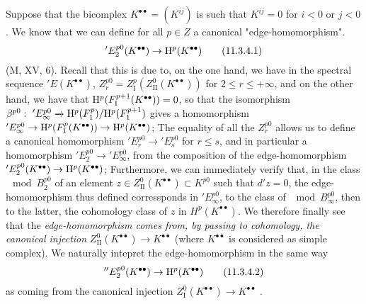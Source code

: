 \begin{env}[11.3.4]
\label{0.11.3.4}
Suppose that the bicomplex $K^{\bullet\bullet}=(K^{ij})$ is such that $K^{ij}=0$ for $i<0$ or $j<0$.
We know that we can define for all $p \in Z$ a canonical "edge-homomorphism".
  \[
\label{0.11.3.4.1}
    'E_2^{p0}(K^{\bullet\bullet}) \rightarrow \mathrm{H}^{p}(K^{\bullet\bullet})
\tag{11.3.4.1}
  \]
(M, XV, 6).
Recall that this is due to, on the one hand, we have in the spectral sequence
$'E(K^{\bullet\bullet})$, $Z_r^{p0}=Z_{\text{I}}^{p}(Z_{\text{II}}^{0}(K^{\bullet\bullet}))$ for $2\leq r \leq +\infty$, 
and on the other hand, we have that $\mathrm{H}^{p}(F_\text{I}^{p+1}(K^{\bullet\bullet})) = 0$, 
so that the isomorphism $\beta^{p0}:\ 'E_\infty^{p0} \xrightarrow[]{~} \mathrm{H}^{p}(F_1^p)/\mathrm{H}^{p}(F_1^{p+1})$
gives a homomorphism $'E_\infty^{p0} \rightarrow \mathrm{H}^{p}(F_1^p(K^{\bullet\bullet})) \rightarrow \mathrm{H}^{p}(K^{\bullet\bullet})$; 
The equality of all the $Z_r^{p0}$ allows us to define a canonical homomorphism $'E_r^{p0} \rightarrow 'E_s^{p0}$ for $r \leq s$, 
and in particular a homomorphism $'E_2^{p0} \rightarrow 'E_\infty^{p0}$, from the composition of the edge-homomorphism
$'E_2^{p0}(K^{\bullet\bullet}) \rightarrow \mathrm{H}^{p}(K^{\bullet\bullet})$;
Furthermore, we can immediately verify that, in the class $\mod B_2^{p0}$ of an element $z \in Z_\text{II}^0(K^{\bullet\bullet}) \subset K^{p0}$ such that $d'z=0$, 
the edge-homomorphism thus defined corressponds in $'E_{\infty}^{p0}$, to the class of $\mod B_\infty^{p0}$, 
then to the latter, the cohomology class of $z$ in $H^p(K^{\bullet\bullet})$.
We therefore finally see that the \emph{edge-homomorphism  comes from, by passing to cohomology, the canonical injection} $Z_\text{II}^0(K^{\bullet\bullet}) \rightarrow K^{\bullet\bullet}$ 
(where $K^{\bullet\bullet}$ is considered as simple complex).
We naturally intepret the edge-homomorphism in the same way 
  \[
\label{0.11.3.4.2}
    ''E_2^{p0}(K^{\bullet\bullet}) \rightarrow \mathrm{H}^{p}(K^{\bullet\bullet})
\tag{11.3.4.2}
  \]
as coming from the canonical injection $Z_\text{I}^0(K^{\bullet\bullet}) \rightarrow K^{\bullet\bullet}$ .
\end{env}
